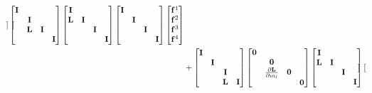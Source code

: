 \documentclass[revised,endfloat]{geophysics}
\begin{document}
\begin{equation}
\begin{split}
\begin{bmatrix}
\end{bmatrix}
\begin{bmatrix}
{\bf I} & & & \\
 & {\bf I} & & \\
 & {\bf L} &  {\bf I}& \\
 & & & {\bf I} \\
\end {bmatrix}
\begin{bmatrix}
{\bf I} & & & \\
{\bf L} & {\bf I} & & \\
 & &  {\bf I}& \\
 & & & {\bf I} \\
\end {bmatrix}
\begin{bmatrix}
{\bf I} & & & \\
& {\bf I} & & \\
 & &  {\bf I}& \\
 & & & {\bf I} \\
\end {bmatrix}
\begin{bmatrix}
{\bf f}^1 \\
{\bf f}^2 \\
{\bf f}^3 \\
{\bf f}^4 \\
\end{bmatrix}                  \\
&+ \begin{bmatrix}
{\bf I} & & & \\
 & {\bf I} & & \\
 & &  {\bf I}& \\
 & & {\bf L}& {\bf I} \\
\end {bmatrix}
\begin{bmatrix}
{\bf 0} & & & \\
 & {\bf 0} & & \\
 & \frac{\partial {\bf L}}{\partial m_l} & {\bf 0}& \\
 & & & {\bf 0} \\
\end {bmatrix}
\begin{bmatrix}
{\bf I} & & & \\
{\bf L} & {\bf I} & & \\
 & &  {\bf I}& \\
 & & & {\bf I} \\
\end {bmatrix}
\begin{bmatrix}

\end{bmatrix}
\end{split}
\end{equation}
\end{document}
